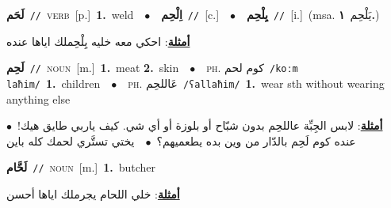 \documentclass[10pt,a4paper,twoside]{article} %
\begin{document}
\begin{multicols}{2}
{\setlength\topsep{0pt}\textbf{\foreignlanguage{arabic}{لَحَم}}\ {\color{gray}\texttt{//}\color{black}}\ \textsc{verb}\ [p.]\ \textbf{1.}~weld\ \ $\bullet$\ \ \setlength\topsep{0pt}\textbf{\foreignlanguage{arabic}{اِلْحِم}}\ {\color{gray}\texttt{//}\color{black}}\ [c.]\ \ $\bullet$\ \ \setlength\topsep{0pt}\textbf{\foreignlanguage{arabic}{يِلْحِم}}\ {\color{gray}\texttt{//}\color{black}}\ [i.]\ \color{gray}(msa. \foreignlanguage{arabic}{يَلْحِم}~\foreignlanguage{arabic}{\textbf{١.}})\color{black}\  \begin{flushright}\color{gray}\foreignlanguage{arabic}{\textbf{\underline{\foreignlanguage{arabic}{أمثلة}}}: احكي معه خليه يِلْحِملك اياها عنده}\end{flushright}\color{black}} \vspace{2mm}

{\setlength\topsep{0pt}\textbf{\foreignlanguage{arabic}{لَحِم}}\ {\color{gray}\texttt{//}\color{black}}\ \textsc{noun}\ [m.]\ \textbf{1.}~meat  \textbf{2.}~skin\ \ $\bullet$\ \ \textsc{ph.} \color{gray} \foreignlanguage{arabic}{كوم لحم}\color{black}\ {\color{gray}\texttt{/{\sffamily koːm laħim}/}\color{black}}\ \textbf{1.}~children\ \ $\bullet$\ \ \textsc{ph.} \color{gray} \foreignlanguage{arabic}{عَاللحِم}\color{black}\ {\color{gray}\texttt{/{\sffamily ʕallaħim}/}\color{black}}\ \textbf{1.}~wear sth without wearing anything else\  \begin{flushright}\color{gray}\foreignlanguage{arabic}{\textbf{\underline{\foreignlanguage{arabic}{أمثلة}}}: لابس الجِبِّة عاللحِم بدون شبّاح أو بلوزة أو أي شي. كيف ياربي طايق هيك!\ $\bullet$\ \  عنده كوم لَحِم بالدّار من وين بده يطعميهم؟\ $\bullet$\ \  يختي تستَّري لحمك كله باين}\end{flushright}\color{black}} \vspace{2mm}

{\setlength\topsep{0pt}\textbf{\foreignlanguage{arabic}{لَحَّام}}\ {\color{gray}\texttt{//}\color{black}}\ \textsc{noun}\ [m.]\ \textbf{1.}~butcher\  \begin{flushright}\color{gray}\foreignlanguage{arabic}{\textbf{\underline{\foreignlanguage{arabic}{أمثلة}}}: خلي اللحام يجرملك اياها أحسن}\end{flushright}\color{black}} \vspace{2mm}


\end{multicols}
\end{document}
